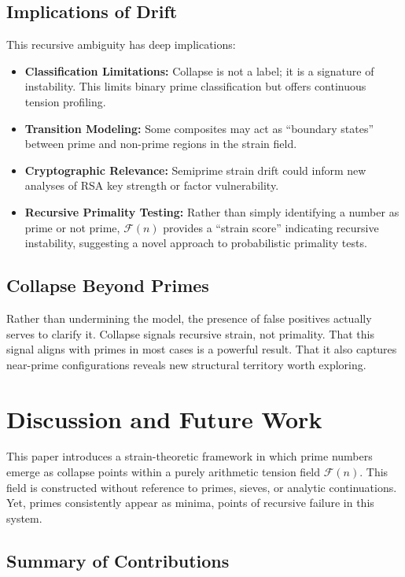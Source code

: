 \documentclass[11pt]{article}
\begin{document}
\subsection{Implications of Drift}

This recursive ambiguity has deep implications:

\begin{itemize}
  \item \textbf{Classification Limitations:} Collapse is not a label; it is a signature of instability. This limits binary prime classification but offers continuous tension profiling.
  \item \textbf{Transition Modeling:} Some composites may act as “boundary states” between prime and non-prime regions in the strain field.
  \item \textbf{Cryptographic Relevance:} Semiprime strain drift could inform new analyses of RSA key strength or factor vulnerability.
  \item \textbf{Recursive Primality Testing:} Rather than simply identifying a number as prime or not prime, $\mathcal{F}(n)$ provides a “strain score” indicating recursive instability, suggesting a novel approach to probabilistic primality tests. 
\end{itemize}

\subsection{Collapse Beyond Primes}

Rather than undermining the model, the presence of false positives actually serves to clarify it. Collapse signals recursive strain, not primality. That this signal aligns with primes in most cases is a powerful result. That it also captures near-prime configurations reveals new structural territory worth exploring.


\section{Discussion and Future Work}

This paper introduces a strain-theoretic framework in which prime numbers emerge as collapse points within a purely arithmetic tension field \(\mathcal{F}(n)\). This field is constructed without reference to primes, sieves, or analytic continuations. Yet, primes consistently appear as minima, points of recursive failure in this system.


\subsection{Summary of Contributions}
\end{document}
